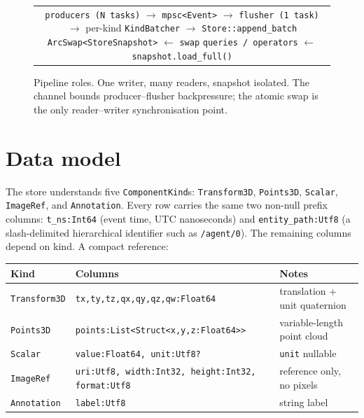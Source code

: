 \documentclass[11pt]{article}
\begin{document}
\begin{figure}[h]
\centering
\begin{tabular}{c}
\fbox{\parbox{0.9\textwidth}{\centering
\texttt{producers (N tasks)} $\longrightarrow$ \texttt{mpsc<Event>}
$\longrightarrow$ \texttt{flusher (1 task)} \\[2pt]
$\longrightarrow$ per-kind \texttt{KindBatcher} $\longrightarrow$
\texttt{Store::append\_batch} \\[2pt]
\texttt{ArcSwap<StoreSnapshot>} $\longleftarrow$ \texttt{swap} \\[2pt]
\texttt{queries / operators} $\longleftarrow$ \texttt{snapshot.load\_full()}
}}
\end{tabular}
\caption{Pipeline roles. One writer, many readers, snapshot isolated. The channel
bounds producer--flusher backpressure; the atomic swap is the only reader--writer
synchronisation point.}
\end{figure}

\section{Data model}

The store understands five \texttt{ComponentKind}s: \texttt{Transform3D},
\texttt{Points3D}, \texttt{Scalar}, \texttt{ImageRef}, and \texttt{Annotation}. Every
row carries the same two non-null prefix columns: \texttt{t\_ns:Int64} (event time, UTC
nanoseconds) and \texttt{entity\_path:Utf8} (a slash-delimited hierarchical identifier
such as \texttt{/agent/0}). The remaining columns depend on kind. A compact reference:

\begin{center}
\small
\begin{tabular}{@{}l l l@{}}
\toprule
\textbf{Kind} & \textbf{Columns} & \textbf{Notes} \\
\midrule
\texttt{Transform3D} & \texttt{tx,ty,tz,qx,qy,qz,qw:Float64} & translation + unit quaternion \\
\texttt{Points3D} & \texttt{points:List<Struct<x,y,z:Float64>{}>} & variable-length point cloud \\
\texttt{Scalar} & \texttt{value:Float64, unit:Utf8?} & \texttt{unit} nullable \\
\texttt{ImageRef} & \texttt{uri:Utf8, width:Int32, height:Int32, format:Utf8} & reference only, no pixels \\
\texttt{Annotation} & \texttt{label:Utf8} & string label \\
\bottomrule
\end{tabular}
\end{center}
\end{document}
